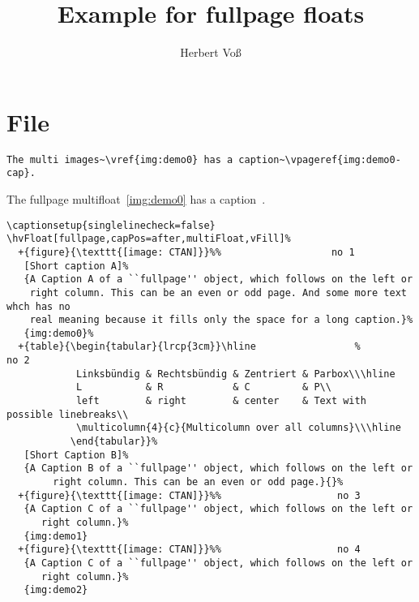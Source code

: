 \documentclass{scrartcl}
\begin{document}
\title{Example for fullpage floats}
\author{Herbert Voß}
\maketitle

\tableofcontents

\blinddocument

\section{File \texttt{\jobname}}

\begin{lstlisting}
The multi images~\vref{img:demo0} has a caption~\vpageref{img:demo0-cap}.
\end{lstlisting}

The fullpage multifloat~\vref{img:demo0} has a caption~.


\begin{lstlisting}
\captionsetup{singlelinecheck=false}
\hvFloat[fullpage,capPos=after,multiFloat,vFill]%
  +{figure}{\texttt{[image: CTAN]}}%%                   no 1
   [Short caption A]%
   {A Caption A of a ``fullpage'' object, which follows on the left or
    right column. This can be an even or odd page. And some more text whch has no
    real meaning because it fills only the space for a long caption.}%
   {img:demo0}%
  +{table}{\begin{tabular}{lrcp{3cm}}\hline                 %             no 2
            Linksbündig & Rechtsbündig & Zentriert & Parbox\\\hline
            L           & R            & C         & P\\
            left        & right        & center    & Text with possible linebreaks\\
            \multicolumn{4}{c}{Multicolumn over all columns}\\\hline
           \end{tabular}}%
   [Short Caption B]%
   {A Caption B of a ``fullpage'' object, which follows on the left or
        right column. This can be an even or odd page.}{}%
  +{figure}{\texttt{[image: CTAN]}}%%                    no 3
   {A Caption C of a ``fullpage'' object, which follows on the left or
      right column.}%
   {img:demo1}
  +{figure}{\texttt{[image: CTAN]}}%%                    no 4
   {A Caption C of a ``fullpage'' object, which follows on the left or
      right column.}%
   {img:demo2}
\end{lstlisting}
\end{document}
